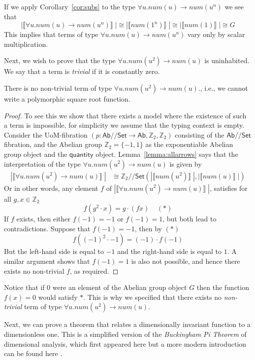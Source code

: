 \documentclass[a4paper,UKenglish]{lipics}
\newcommand{\msf}[1]{\mathsf{#1}} %
\newcommand{\Ab}{\msf{Ab}}
\newcommand{\Set}{\msf{Set}}
\newcommand{\GroupSet}[1]{#1/\!/\Set}
\newcommand{\AbSet}{\GroupSet{\Ab}}
\newcommand{\bbZ}{\mathbb{Z}}
\newcommand{\sem}[1]{\ensuremath{\llbracket #1 \rrbracket} \;}
\newcommand{\num}{\msf{quantity}}
\begin{document}
If we apply Corollary~\ref{cor:subs} to the type $\forall u. num(u)\rightarrow num(u^n)$ we see that
\[
 |\sem{\forall u. num(u)\rightarrow num(u^n)}| \cong |\sem{num(1^n)}| \cong |\sem{num(1)}| \cong G
\]
This implies that terms of type $\forall u. num(u)\rightarrow num(u^n)$ vary only by scalar multiplication.


Next, we wish to prove that the type  $\forall u . num(u^2) \rightarrow num(u)$ is uninhabited. We say that a term is \emph{trivial} if it is constantly zero.

\begin{theorem}
\label{thm:UninhabType}
 There is no non-trivial term of type $\forall u . num(u^2) \rightarrow num(u)$., i.e., we cannot write a polymorphic square root function.
\end{theorem}
\begin{proof}
To see this we show that there exists a model where the existence of such a term is impossible, for simplicity we assume that the typing context is empty. Consider the UoM-fibration $(p:\AbSet \rightarrow \Ab, \mathbb{Z}_2, \mathbb{Z}_2)$  consisting of the $\AbSet$ fibration, and the Abelian group $\mathbb{Z}_2 = \{ -1, 1\}$ as the exponentiable Abelian group object and the $\num$ object. Lemma~\ref{lemma:allarrows} says that the interpretation of the type $\forall u . num(u^2) \rightarrow num(u)$ is given by
\begin{align*}
  |\sem{\forall u . num(u^2) \rightarrow num(u)}|  &  \cong \GroupSet{\mathbb{Z}_2} (|\sem{num (u^2)}|, |\sem{num(u)}|)
\end{align*}
Or in other words, any element $f$ of $ |\sem{\forall u . num(u^2) \rightarrow num(u)}|$, satisfies for all $g, x \in \bbZ_2$
\[
f (g^2 \cdot x) = g \cdot (fx) \; \; \; \; (\ast)
\]
If $f$ exists, then either $f(-1) = -1$ or $f(-1) = 1$, but both lead to contradictions. Suppose that $f(-1) = -1$, then by $(\ast)$
\[
 f((-1)^2 \cdot -1) = (-1) \cdot f(-1)
\]
But the left-hand side is equal to $-1$ and the right-hand side is equal to $1$. A similar argument shows that $f(-1)=1$ is also not possible, and hence there exists no non-trivial $f$, as required.
\end{proof}

Notice that if $0$ were an element of the Abelian group object $G$ then the function $f(x) = 0$ would satisfy $\ast$. This is why we specified that there exists no \emph{non-trivial} term of type $\forall u . num(u^2) \rightarrow num(u)$.

Next, we can prove a theorem that relates a dimensionally invariant function to a dimensionless one. This is a simplified version of the \emph{Buckingham Pi Theorem} of dimensional analysis, which first appeared here \cite{buckingham1914physically} but a more modern introduction can be found here \cite{sonin2001physical}.
\end{document}
